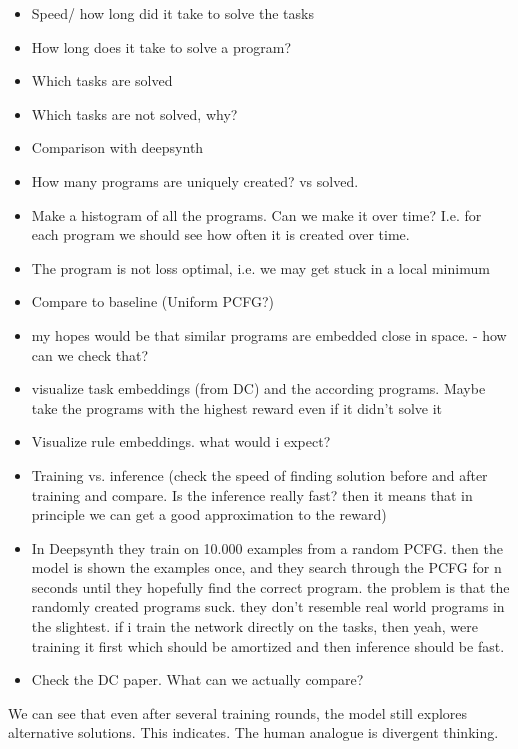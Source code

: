 \begin{itemize}
    \item Speed/ how long did it take to solve the tasks
    \item How long does it take to solve a program?
    \item Which tasks are solved
    \item Which tasks are not solved, why?
    \item Comparison with deepsynth
    \item How many programs are uniquely created? vs solved.
	\item Make a histogram of all the programs. Can we make it over time? I.e. for each program we should see how often it is created over time. 
    \item The program is not loss optimal, i.e. we may get stuck in a local minimum
    \item Compare to baseline (Uniform PCFG?)
    \item my hopes would be that similar programs are embedded close in space. - how can we check that?
    \item visualize task embeddings (from DC) and the according programs. Maybe take the programs with the highest reward even if it didn't solve it
    \item Visualize rule embeddings. what would i expect? 
    \item Training vs. inference (check the speed of finding solution before and after training and compare. Is the inference really fast? then it means that in principle we can get a good approximation to the reward)
    \item In Deepsynth they train on 10.000 examples from a random PCFG. then the model is shown the examples once, and they search through the PCFG for n seconds until they hopefully find the correct program. the problem is that the randomly created programs suck. they don't resemble real world programs in the slightest. if i train the network directly on the tasks, then yeah, were training it first which should be amortized and then inference should be fast.
    \item Check the DC paper. What can we actually compare?
\end{itemize}




We can see that even after several training rounds, the model still explores alternative solutions. This indicates. The human analogue is divergent thinking. 


